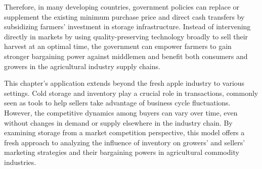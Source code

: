 Therefore, in many developing countries, government policies can replace or supplement the existing minimum purchase price and direct cash transfers by subsidizing farmers' investment in storage infrastructure. Instead of intervening directly in markets by using quality-preserving technology broadly to sell their harvest at an optimal time, the government can empower farmers to gain stronger bargaining power against middlemen and benefit both consumers and growers in the agricultural industry supply chains.

This chapter's application extends beyond the fresh apple industry to various settings. Cold storage and inventory play a crucial role in transactions, commonly seen as tools to help sellers take advantage of business cycle fluctuations. However, the competitive dynamics among buyers can vary over time, even without changes in demand or supply elsewhere in the industry chain. By examining storage from a market competition perspective, this model offers a fresh approach to analyzing the influence of inventory on growers' and sellers' marketing strategies and their bargaining powers in agricultural commodity industries.






